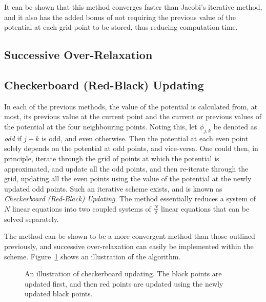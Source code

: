 \documentclass[11pt, a4paper]{article}
\begin{document}
It can be shown that this method converges faster than Jacobi's iterative
method, and it also has the added bonus of not requiring the previous value of the 
potential at each grid point to be stored, thus reducing computation time.

\subsection{Successive Over-Relaxation}


\subsection{Checkerboard (Red-Black) Updating}

In each of the previous methods, the value of the potential is calculated from, at most,
its previous value at the current point and the current or previous values of the
potential at the four neighbouring points. Noting this, let $\phi_{j,k}$ be denoted as
\emph{odd} if $j+k$ is odd, and even otherwise. Then the potential at each even point
solely depends on the potential at odd points, and vice-versa. One could then, in
principle, iterate through the grid of points at which the potential is approximated,
and update all the odd points, and then re-iterate through the grid, updating all the
even points using the value of the potential at the newly updated odd points. Such an
iterative scheme exists, and is known as \emph{Checkerboard (Red-Black) Updating}. The
method essentially reduces a system of $N$ linear equations into two coupled systems
of $\frac{N}{2}$ linear equations that can be solved separately.

The method can be shown to be a more convergent method than those outlined previously,
and successive over-relaxation can easily be implemented within the scheme.
Figure~\ref{fig:checker} shows an illustration of the algorithm.

\begin{figure}[h!]
\begin{center}
\end{center}
\caption{An illustration of checkerboard updating. The black points are updated first,
and then red points are updated using the newly updated black points.}
\label{fig:checker}
\end{figure}
\end{document}
